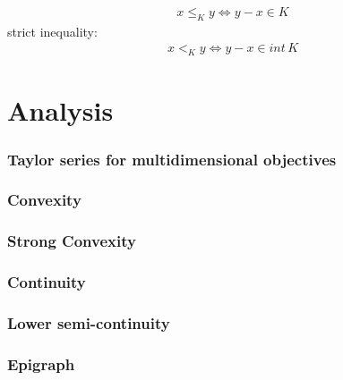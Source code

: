 \documentclass[a4paper,10pt]{report}
\begin{document}
  \begin{align}
    x \leq_K y \Leftrightarrow y - x \in K
  \end{align}
  strict inequality:  
  \begin{align}
    x <_K y \Leftrightarrow y - x \in int \, K
  \end{align}
  

\section{Analysis}

\subsubsection{Taylor series for multidimensional objectives}


\subsubsection{Convexity}

\subsubsection{Strong Convexity}

\subsubsection{Continuity}

\subsubsection{Lower semi-continuity}


\subsubsection{Epigraph}
\end{document}
